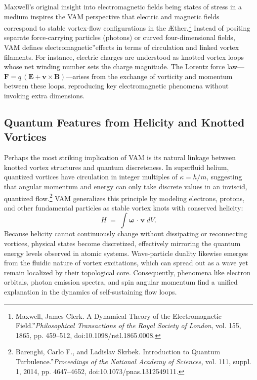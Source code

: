 \documentclass[a4paper,12pt]{article}
\begin{document}
Maxwell's original insight into electromagnetic fields being states of stress in a medium inspires the VAM perspective that electric and magnetic fields correspond to stable vortex-flow configurations in the Æther.\footnote{Maxwell, James Clerk. \grqq A Dynamical Theory of the Electromagnetic Field.\textquotedblright \textit{Philosophical Transactions of the Royal Society of London}, vol. 155, 1865, pp. 459–512, doi:10.1098/rstl.1865.0008.} Instead of positing separate force-carrying particles (photons) or curved four-dimensional fields, VAM defines \grqq electromagnetic\textquotedblright effects in terms of circulation and linked vortex filaments. For instance, electric charges are understood as knotted vortex loops whose net winding number sets the charge magnitude. The Lorentz force law—\(\mathbf{F} = q\,(\mathbf{E} + \mathbf{v}\times\mathbf{B})\)—arises from the exchange of vorticity and momentum between these loops, reproducing key electromagnetic phenomena without invoking extra dimensions.

\subsection*{Quantum Features from Helicity and Knotted Vortices}

Perhaps the most striking implication of VAM is its natural linkage between knotted vortex structures and quantum discreteness. In superfluid helium, quantized vortices have circulation in integer multiples of \(\kappa = h / m\), suggesting that angular momentum and energy can only take discrete values in an inviscid, quantized flow.\footnote{Barenghi, Carlo F., and Ladislav Skrbek. \grqq Introduction to Quantum Turbulence.\textquotedblright \textit{Proceedings of the National Academy of Sciences}, vol. 111, suppl. 1, 2014, pp. 4647–4652, doi:10.1073/pnas.1312549111.} VAM generalizes this principle by modeling electrons, protons, and other fundamental particles as stable vortex knots with conserved helicity:
\[
    H \;=\; \int \boldsymbol{\omega} \,\cdot\, \mathbf{v}\; dV.
\]
Because helicity cannot continuously change without dissipating or reconnecting vortices, physical states become discretized, effectively mirroring the quantum energy levels observed in atomic systems. Wave-particle duality likewise emerges from the fluidic nature of vortex excitations, which can spread out as a wave yet remain localized by their topological core. Consequently, phenomena like electron orbitals, photon emission spectra, and spin angular momentum find a unified explanation in the dynamics of self-sustaining flow loops.
\end{document}
